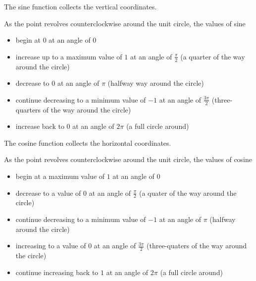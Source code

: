 \documentclass{ximera}
\begin{document}
The sine function collects the vertical coordinates.


\begin{center}
\end{center}

As the point revolves counterclockwise around the unit circle, the values of sine 

\begin{itemize}
\item begin at $0$ at an angle of $0$
\item increase up to a maximum value of $1$ at an angle of $\frac{\pi}{2}$ (a quarter of the way around the circle)
\item decrease to $0$ at an angle of $\pi$ (halfway way around the circle)
\item continue decreasing to a minimum value of $-1$ at an angle of $\frac{3 \pi}{2}$ (three-quarters of the way around the circle)
\item increase back to $0$ at an angle of $2 \pi$ (a full circle around)
\end{itemize}










The cosine function collects the horizontal coordinates.

\begin{center}
\end{center}

As the point revolves counterclockwise around the unit circle, the values of cosine 

\begin{itemize}
\item begin at a maximum value of $1$ at an angle of $0$
\item decrease to a value of $0$ at an angle of $\frac{\pi}{2}$ (a quater of the way around the circle)
\item continue decreasing to a minimum value of $-1$ at an angle of $\pi$ (halfway around the circle)
\item increasing to a value of $0$ at an angle of $\frac{3 \pi}{2}$ (three-quaters of the way around the circle)
\item continue increasing back to $1$ at an angle of $2 \pi$ (a full circle around)
\end{itemize}
\end{document}
